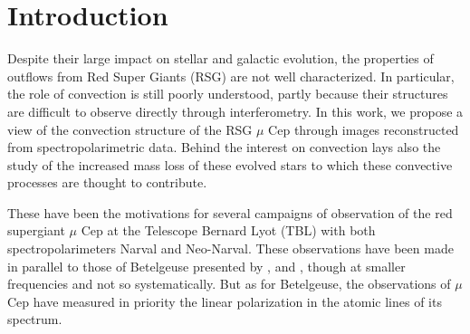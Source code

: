 \documentclass{/Users/art2/TeX/aanda/aa}
\begin{document}
   \keywords{}


   \maketitle
%

\section{Introduction}

Despite their large impact on stellar and galactic evolution, the properties of outflows from Red Super Giants (RSG) are not well characterized. In particular, the role of convection is still poorly understood, partly because their structures are difficult to observe directly through interferometry. In this work, we propose a view of the convection structure of the RSG $\mu$ Cep through images reconstructed from spectropolarimetric data. Behind the interest on convection lays also the study of the increased mass loss of these evolved stars to which these convective processes are thought to contribute.




These have been the motivations for several campaigns of observation of the red supergiant $\mu$ Cep at the Telescope Bernard Lyot (TBL) with both spectropolarimeters Narval and Neo-Narval. These observations have been made in parallel to those of Betelgeuse presented by  \cite{Auriere_2016}, \cite{Mathias:2018aa} and \cite{LA18}, though at smaller frequencies and not so systematically. But as for Betelgeuse, the observations of $\mu$ Cep have measured in priority the linear polarization in the atomic lines of its spectrum. 
\end{document}
